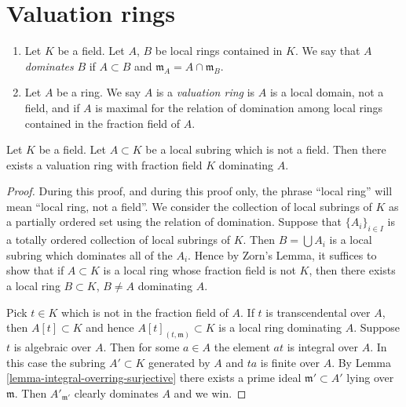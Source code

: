 \section{Valuation rings}
\label{section-valuation-rings}

\begin{definition}
\label{definition-valuation-ring}
\begin{enumerate}
\item Let $K$ be a field. Let $A$, $B$ be local rings contained
in $K$. We say that $A$ {\it dominates} $B$ if $A \subset B$
and $\mathfrak m_A = A \cap \mathfrak m_B$.
\item Let $A$ be a ring. We say $A$ is a {\it valuation ring}
is $A$ is a local domain, not a field, and if $A$ is maximal
for the relation of domination among local rings contained in
the fraction field of $A$.
\end{enumerate}
\end{definition}

\begin{lemma}
\label{lemma-dominate}
Let $K$ be a field.
Let $A \subset K$ be a local subring which is not a field.
Then there exists a valuation ring with fraction field $K$
dominating $A$.
\end{lemma}

\begin{proof}
During this proof, and during this proof only, the phrase
``local ring'' will mean ``local ring, not a field''.
We consider the collection of local subrings
of $K$ as a partially ordered set using the relation of domination.
Suppose that $\{A_i\}_{i \in I}$ is a totally ordered
collection of local subrings of $K$. Then $B = \bigcup A_i$
is a local subring which dominates all of the $A_i$.
Hence by Zorn's Lemma, it suffices to show that if $A \subset K$
is a local ring whose fraction field is not $K$, then there
exists a local ring $B \subset K$, $B \not = A$ dominating $A$.

\medskip\noindent
Pick $t \in K$ which is not in the fraction field of $A$.
If $t$ is transcendental over $A$, then $A[t] \subset K$
and hence $A[t]_{(t, \mathfrak m)} \subset K$ is a local ring
dominating $A$.
Suppose $t$ is algebraic over $A$.
Then for some $a \in A$ the element $at$ is integral over $A$.
In this case the subring $A' \subset K$ generated by $A$ and
$ta$ is finite over $A$.
By Lemma \ref{lemma-integral-overring-surjective} there exists
a prime ideal $\mathfrak m' \subset A'$ lying over
$\mathfrak m$. Then $A'_{\mathfrak m'}$ clearly dominates
$A$ and we win.
\end{proof}

